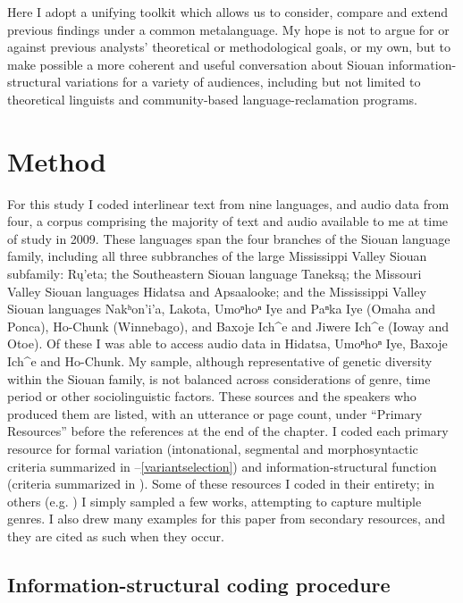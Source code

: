 \documentclass[output=paper]{LSP/langsci}
\begin{document}
	Here I adopt a unifying toolkit which allows us to consider, compare and extend previous findings under a common metalanguage. My hope is not to argue for or against previous analysts’ theoretical or methodological goals, or my own, but to make possible a more coherent and useful conversation about Siouan information-structural variations for a variety of audiences, including but not limited to theoretical linguists and community-based language-reclamation programs.

\section{Method}

For this study I coded interlinear text from nine languages, and audio data from four, a corpus comprising the majority of text and audio available to me at time of study in 2009. These languages span the four branches of the Siouan language family, including all three subbranches of the large Mississippi Valley Siouan subfamily: Rų’eta; the Southeastern Siouan language Taneksą; the Missouri Valley Siouan languages Hidatsa and Apsaalooke; and the Mississippi Valley Siouan languages Nakʰon’i’a, Lakota, Umoⁿhoⁿ Iye and Paⁿka Iye (Omaha and Ponca), Ho-Chunk (Winnebago), and Baxoje Ich\^{}e and Jiwere Ich\^{}e (Ioway and Otoe). Of these I was able to access audio data in Hidatsa, Umoⁿhoⁿ Iye, Baxoje Ich\^{}e and Ho-Chunk. My sample, although representative of genetic diversity within the Siouan family, is not balanced across considerations of genre, time period or other sociolinguistic factors. These sources and the speakers who produced them are listed, with an utterance or page count, under “Primary Resources” before the references at the end of the chapter. I coded each primary resource for formal variation (intonational, segmental and morphosyntactic criteria summarized in --\ref{variantselection}) and information-structural function (criteria summarized in ). Some of these resources I coded in their entirety; in others (e.g. \citealt{Dorsey1890}) I simply sampled a few works, attempting to capture multiple genres. I also drew many examples for this paper from secondary resources, and they are cited as such when they occur.

\subsection{Information-structural coding procedure}\label{informationcoding}
\end{document}
